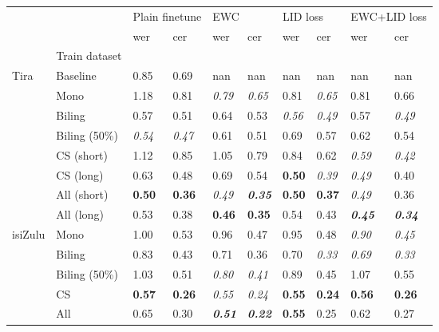 \begin{tabular}{llllllllll}
\toprule
 &  & \multicolumn{2}{l}{Plain finetune} & \multicolumn{2}{l}{EWC} & \multicolumn{2}{l}{LID loss} & \multicolumn{2}{l}{EWC+LID loss} \\
 &  & wer & cer & wer & cer & wer & cer & wer & cer \\
 & Train dataset &  &  &  &  &  &  &  &  \\
\midrule
Tira & Baseline & 0.85 & 0.69 & nan & nan & nan & nan & nan & nan \\
 & Mono & 1.18 & 0.81 & \textit{0.79} & \textit{0.65} & 0.81 & \textit{0.65} & 0.81 & 0.66 \\
 & Biling & 0.57 & 0.51 & 0.64 & 0.53 & \textit{0.56} & \textit{0.49} & 0.57 & \textit{0.49} \\
 & Biling (50\%) & \textit{0.54} & \textit{0.47} & 0.61 & 0.51 & 0.69 & 0.57 & 0.62 & 0.54 \\
 & CS (short) & 1.12 & 0.85 & 1.05 & 0.79 & 0.84 & 0.62 & \textit{0.59} & \textit{0.42} \\
 & CS (long) & 0.63 & 0.48 & 0.69 & 0.54 & \textbf{0.50} & \textit{0.39} & \textit{0.49} & 0.40 \\
 & All (short) & \textbf{0.50} & \textbf{0.36} & \textit{0.49} & \textit{\textbf{0.35}} & \textbf{0.50} & \textbf{0.37} & \textit{0.49} & 0.36 \\
 & All (long) & 0.53 & 0.38 & \textbf{0.46} & \textbf{0.35} & 0.54 & 0.43 & \textit{\textbf{0.45}} & \textit{\textbf{0.34}} \\
isiZulu & Mono & 1.00 & 0.53 & 0.96 & 0.47 & 0.95 & 0.48 & \textit{0.90} & \textit{0.45} \\
 & Biling & 0.83 & 0.43 & 0.71 & 0.36 & 0.70 & \textit{0.33} & \textit{0.69} & \textit{0.33} \\
 & Biling (50\%) & 1.03 & 0.51 & \textit{0.80} & \textit{0.41} & 0.89 & 0.45 & 1.07 & 0.55 \\
 & CS & \textbf{0.57} & \textbf{0.26} & \textit{0.55} & \textit{0.24} & \textbf{0.55} & \textbf{0.24} & \textbf{0.56} & \textbf{0.26} \\
 & All & 0.65 & 0.30 & \textit{\textbf{0.51}} & \textit{\textbf{0.22}} & \textbf{0.55} & 0.25 & 0.62 & 0.27 \\
\bottomrule
\end{tabular}
